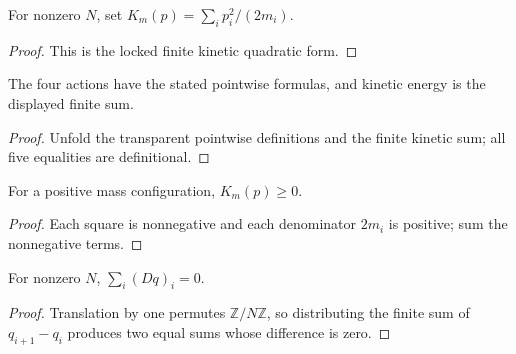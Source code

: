 \begin{definition}
\label{def:lattice:kinetic-energy}
For nonzero $N$, set $K_m(p)=\sum_ip_i^2/(2m_i)$.
\end{definition}
\begin{proof}\leanok
This is the locked finite kinetic quadratic form.\end{proof}

\begin{theorem}
\label{thm:lattice:mass-algebra}
The four actions have the stated pointwise formulas, and kinetic energy is the displayed finite sum.
\end{theorem}
\begin{proof}\leanok
Unfold the transparent pointwise definitions and the finite kinetic sum; all five equalities are definitional.\end{proof}

\begin{theorem}
\label{thm:lattice:kinetic-nonneg}
For a positive mass configuration, $K_m(p)\ge0$.
\end{theorem}
\begin{proof}\leanok
Each square is nonnegative and each denominator $2m_i$ is positive; sum the nonnegative terms.\end{proof}

\begin{theorem}
\label{thm:lattice:sum-forward-difference}
For nonzero $N$, $\sum_i(Dq)_i=0$.
\end{theorem}
\begin{proof}\leanok
Translation by one permutes $\mathbb Z/N\mathbb Z$, so distributing the finite sum of $q_{i+1}-q_i$ produces two equal sums whose difference is zero.\end{proof}

